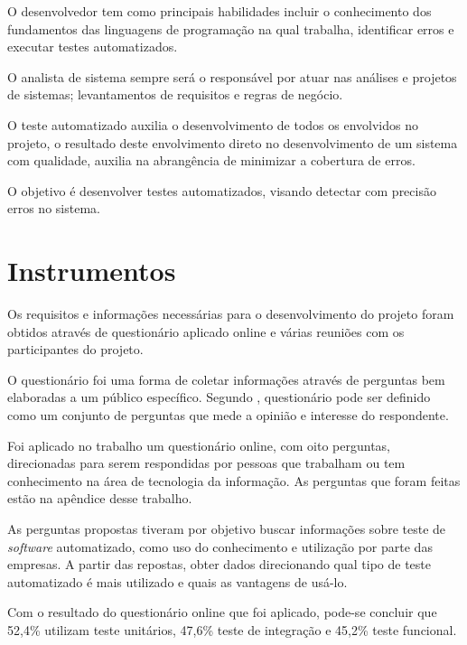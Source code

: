 \par O desenvolvedor tem como principais habilidades incluir o conhecimento dos fundamentos das linguagens de programação na qual trabalha, identificar erros e executar testes automatizados.
 
\par O analista de sistema sempre será o responsável por atuar nas análises e projetos de sistemas; levantamentos de requisitos e regras de negócio.

\par O teste automatizado auxilia o desenvolvimento de todos os envolvidos no projeto, o resultado deste envolvimento direto no desenvolvimento de um sistema com qualidade, auxilia na abrangência de minimizar a cobertura de erros.

\par O objetivo é desenvolver testes automatizados, visando detectar com precisão erros no sistema.


\section{Instrumentos}

\par Os requisitos e informações necessárias para o desenvolvimento do projeto foram obtidos através de questionário aplicado online e várias reuniões com os participantes do projeto.

\par O questionário foi uma forma de coletar informações através de perguntas bem elaboradas a um público específico. Segundo , questionário pode ser definido como um conjunto de perguntas que mede a opinião e interesse do respondente.

\par Foi aplicado no trabalho um questionário online, com oito perguntas, direcionadas para serem respondidas por pessoas que trabalham ou tem conhecimento na área de tecnologia da informação. As perguntas que foram feitas estão na apêndice desse trabalho.

\par As perguntas propostas tiveram por objetivo buscar informações sobre teste de \textit{software} automatizado, como uso do conhecimento e utilização por parte das empresas. A partir das repostas, obter dados direcionando qual tipo de teste automatizado é mais utilizado e quais as vantagens de usá-lo.

\par Com o resultado do questionário online que foi aplicado, pode-se concluir que 52,4\% utilizam teste unitários, 47,6\% teste de integração e 45,2\% teste funcional.


